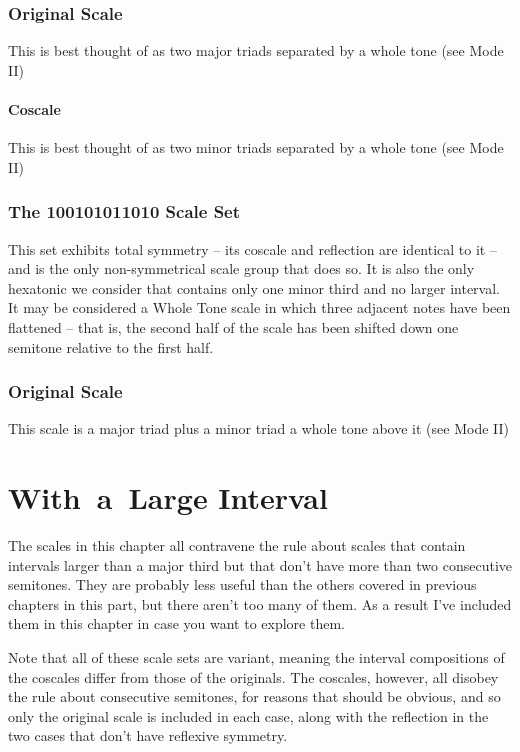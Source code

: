 \documentclass[english]{./gbook}
\begin{document}
\begin{large}
\subsection*{Original Scale}
This is best thought of as two major triads separated by a whole tone (see Mode II)
\subsubsection*{Coscale}
This is best thought of as two minor triads separated by a whole tone (see Mode II)

\subsection{The 100101011010 Scale Set}

This set exhibits total symmetry -- its coscale and reflection are identical to it -- and is the only non-symmetrical scale group that does so. It is also the only hexatonic we consider that contains only one minor third and no larger interval. It may be considered a Whole Tone scale in which three adjacent notes have been flattened -- that is, the second half of the scale has been shifted down one semitone relative to the first half.

\subsection*{Original Scale}
This scale is a major triad plus a minor triad a whole tone above it (see Mode II)

\chapter{\mbox{With a Large} \mbox{Interval}}

The scales in this chapter all contravene the rule about scales that contain intervals larger than a major third but that don't have more than two consecutive semitones. They are probably less useful than the others covered in previous chapters in this part, but there aren't too many of them. As a result I've included them in this chapter in case you want to explore them.

Note that all of these scale sets are variant, meaning the interval compositions of the coscales differ from those of the originals. The coscales, however, all disobey the rule about consecutive semitones, for reasons that should be obvious, and so only the original scale is included in each case, along with the reflection in the two cases that don't have reflexive symmetry.


\end{large}
\end{document}
